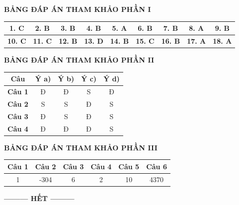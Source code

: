 \documentclass[12pt,a4paper]{article}
\begin{document}
\newpage
\noindent\textbf{\large BẢNG ĐÁP ÁN THAM KHẢO PHẦN I}
\vspace{0.2cm}

\begin{center}
\begin{tabular}{|c|c|c|c|c|c|c|c|c|}
\hline
\textbf{1. C} & \textbf{2. B} & \textbf{3. B} & \textbf{4. B} & \textbf{5. A} & \textbf{6. B} & \textbf{7. B} & \textbf{8. A} & \textbf{9. B} \\
\hline
\textbf{10. C} & \textbf{11. C} & \textbf{12. B} & \textbf{13. D} & \textbf{14. B} & \textbf{15. C} & \textbf{16. B} & \textbf{17. A} & \textbf{18. A} \\
\hline
\end{tabular}
\end{center}

\bigskip
\noindent\textbf{\large BẢNG ĐÁP ÁN THAM KHẢO PHẦN II}
\vspace{0.2cm}

\begin{center}
\begin{tabular}{|c|c|c|c|c|}
\hline
\textbf{Câu} & \textbf{Ý a)} & \textbf{Ý b)} & \textbf{Ý c)} & \textbf{Ý d)} \\
\hline
\textbf{Câu 1} & Đ & Đ & S & Đ \\
\hline
\textbf{Câu 2} & S & S & Đ & S \\
\hline
\textbf{Câu 3} & Đ & S & Đ & S \\
\hline
\textbf{Câu 4} & Đ & Đ & Đ & S \\
\hline
\end{tabular}
\end{center}

\bigskip
\noindent\textbf{\large BẢNG ĐÁP ÁN THAM KHẢO PHẦN III}
\vspace{0.2cm}

\begin{center}
\begin{tabular}{|c|c|c|c|c|c|}
\hline
\textbf{Câu 1} & \textbf{Câu 2} & \textbf{Câu 3} & \textbf{Câu 4} & \textbf{Câu 5} & \textbf{Câu 6} \\
\hline
1 & -304 & 6 & 2 & 10 & 4370 \\
\hline
\end{tabular}
\end{center}

\begin{center}
\textbf{--------- HẾT ---------}
\end{center}
\end{document}
